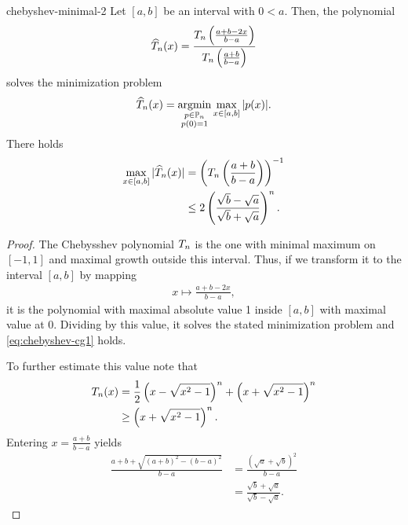 \begin{Corollary}{chebyshev-minimal-2}
  Let $[a,b]$ be an interval with $0 < a$. Then, the polynomial
  \begin{gather}
    \widehat \pchebyshev_n(x)
    = \frac{\pchebyshev_n\left(\frac{a+b-2x}{b-a}\right)}%
    {\pchebyshev_n\left(\frac{a+b}{b-a}\right)}
  \end{gather}
  solves the minimization problem
  \begin{gather}
    \widehat {T}_n(x)
    = \operatorname*{argmin}_{\substack{p\in\mathbb P_n\\p(0) = 1}}
    \max_{x\in[a,b]}{\lvert p(x)\rvert}.
  \end{gather}
  There holds
  \begin{align}
    \label{eq:chebyshev-cg1}
    \max_{x\in[a,b]}{\lvert\widehat {T}_n(x)\rvert}
    &= \left(T_n\left(\frac{a+b}{b-a}\right)\right)^{-1}\\
    & \le 2 \left(\frac{\sqrt b-\sqrt a}{\sqrt b + \sqrt a}\right)^n.
  \end{align}
\end{Corollary}

\begin{proof}
  The Chebysshev polynomial $T_n$ is the one with minimal maximum on $[-1,1]$ and maximal growth outside this interval. Thus, if we transform it to the interval $[a,b]$ by mapping
  \begin{gather}
    x \mapsto \frac{a+b-2x}{b-a},
  \end{gather}
  it is the polynomial with maximal absolute value 1 inside $[a,b]$
  with maximal value at 0. Dividing by this value, it solves the
  stated minimization problem and \eqref{eq:chebyshev-cg1} holds.

  To further estimate this value note that
  \begin{align}
    T_n(x)
    &= \frac12
      \left(x-\sqrt{x^2-1}\right)^n
      +
      \left(x+\sqrt{x^2-1}\right)^n\\
    &\ge \left(x+\sqrt{x^2-1}\right)^n.
  \end{align}
  Entering $x = \frac{a+b}{b-a}$ yields
  \begin{align}
    \frac{a+b+\sqrt{(a+b)^2-(b-a)^2}}{b-a}
    &= \frac{(\sqrt a + \sqrt b)^2}{b-a}\\
    &= \frac{\sqrt b + \sqrt a}{\sqrt b-\sqrt a}.
  \end{align}
\end{proof}



\printindex

